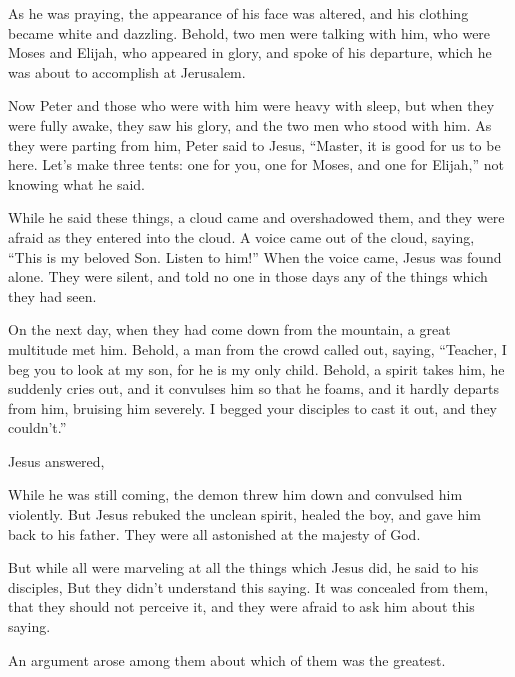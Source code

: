 {As he was praying, the appearance of his face was altered, and his clothing became white and dazzling.
Behold, two men were talking with him, who were Moses and Elijah,
who appeared in glory, and spoke of his departure, which he was about to accomplish at Jerusalem.
\par }{\PP {}Now Peter and those who were with him were heavy with sleep, but when they were fully awake, they saw his glory, and the two men who stood with him.
As they were parting from him, Peter said to Jesus, “Master, it is good for us to be here. Let’s make three tents: one for you, one for Moses, and one for Elijah,” not knowing what he said.
\par }{\PP {}While he said these things, a cloud came and overshadowed them, and they were afraid as they entered into the cloud.
A voice came out of the cloud, saying, “This is my beloved Son. Listen to him!”
When the voice came, Jesus was found alone. They were silent, and told no one in those days any of the things which they had seen.
\par }{\PP {}On the next day, when they had come down from the mountain, a great multitude met him.
Behold, a man from the crowd called out, saying, “Teacher, I beg you to look at my son, for he is my only child.
Behold, a spirit takes him, he suddenly cries out, and it convulses him so that he foams, and it hardly departs from him, bruising him severely.
I begged your disciples to cast it out, and they couldn’t.”
\par }{\PP {}Jesus answered,
{}
\par }{\PP {}While he was still coming, the demon threw him down and convulsed him violently. But Jesus rebuked the unclean spirit, healed the boy, and gave him back to his father.
They were all astonished at the majesty of God.
\par }{\PP But while all were marveling at all the things which Jesus did, he said to his disciples,
But they didn’t understand this saying. It was concealed from them, that they should not perceive it, and they were afraid to ask him about this saying.
\par }{\PP {}An argument arose among them about which of them was the greatest.
}
